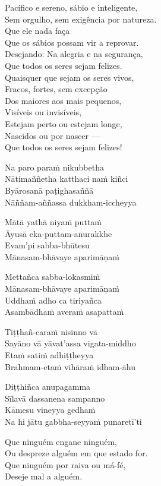 Pacífico e sereno, sábio e inteligente,\\
Sem orgulho, sem exigência por natureza.\\
Que ele nada faça\\
Que os sábios possam vir a reprovar.\\
Desejando: Na alegria e na segurança,\\
Que todos os seres sejam felizes.\\
Quaisquer que sejam os seres vivos,\\
Fracos, fortes, sem excepção\\
Dos maiores aos mais pequenos,\\
Visíveis ou invisíveis,\\
Estejam perto ou estejam longe,\\
Nascidos ou por nascer ---\\
Que todos os seres sejam felizes!

\clearpage

Na paro paraṁ nikubbetha\\
Nātimaññetha katthaci naṁ kiñci\\
Byārosanā paṭighasaññā\\
Nāññam-aññassa dukkham-iccheyya

Mātā yathā niyaṁ puttaṁ\\
Āyusā eka-puttam-anurakkhe\\
Evam'pi sabba-bhūtesu\\
Mānasam-bhāvaye aparimāṇaṁ

Mettañca sabba-lokasmiṁ\\
Mānasam-bhāvaye aparimāṇaṁ\\
Uddhaṁ adho ca tiriyañca\\
Asambādhaṁ averaṁ asapattaṁ

Tiṭṭhañ-caraṁ nisinno vā\\
Sayāno vā yāvat'assa vigata-middho\\
Etaṁ satiṁ adhiṭṭheyya\\
Brahmam-etaṁ vihāraṁ idham-āhu

Diṭṭhiñca anupagamma\\
Sīlavā dassanena sampanno\\
Kāmesu vineyya gedhaṁ\\
Na hi jātu gabbha-seyyaṁ punaretī'ti

\clearpage

Que ninguém engane ninguém,\\
Ou despreze alguém em que estado for.\\
Que ninguém por raiva ou má-fé,\\
Deseje mal a alguém.

